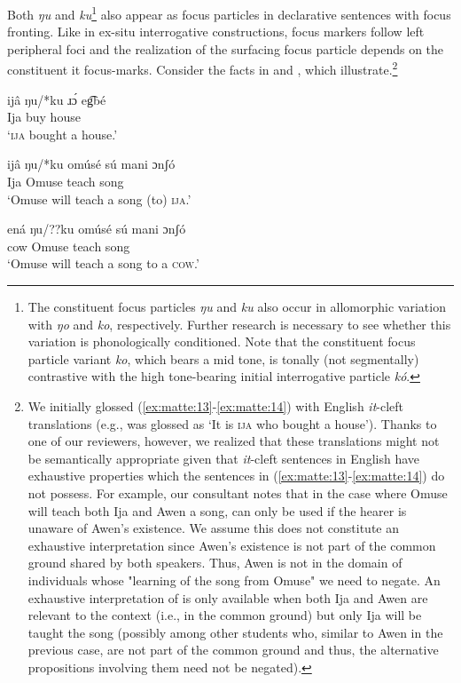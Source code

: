 \documentclass[output=paper,colorlinks,citecolor=brown
]{langscibook}
\begin{document}
Both \textit{ŋu} and \textit{ku}\footnote{The constituent focus particles \textit{ŋu} and \textit{ku} also occur in allomorphic variation with \textit{ŋo} and \textit{ko}, respectively. Further research is necessary to see whether this variation is phonologically conditioned. Note that the constituent focus particle variant \textit{ko}, which bears a mid tone, is tonally (not segmentally) contrastive with the high tone-bearing initial interrogative particle \textit{kó}.} also appear as focus particles in declarative sentences with focus fronting. Like in ex-situ interrogative constructions, focus markers follow left peripheral foci and the realization of the surfacing focus particle depends on the constituent it focus-marks. Consider the facts in  and , which illustrate.\footnote{We initially glossed (\ref{ex:matte:13}-\ref{ex:matte:14}) with English \textit{it}-cleft translations (e.g.,  was glossed as ‘It is \textsc{ija} who bought a house’). Thanks to one of our reviewers, however, we realized that these translations might not be semantically appropriate given that \textit{it}-cleft sentences in English have exhaustive properties which the sentences in (\ref{ex:matte:13}-\ref{ex:matte:14}) do not possess. For example, our consultant notes that in the case where Omuse will teach both Ija and Awen a song,  can only be used if the hearer is unaware of Awen's existence. We assume this does not constitute an exhaustive interpretation since Awen's existence is not part of the common ground shared by both speakers. Thus, Awen is not in the domain of individuals whose "learning of the song from Omuse" we need to negate. An exhaustive interpretation of  is only available when both Ija and Awen are relevant to the context (i.e., in the common ground) but only Ija will be taught the song (possibly among other students who, similar to Awen in the previous case, are not part of the common ground and thus, the alternative propositions involving them need not be negated).}

\ea \label{ex:matte:13}
\begin{xlist}

\ex \label{ex:matte:13a}
\gll ijâ ŋu/*ku ɹɔ́ eg͡bé\\
Ija \Foc{} buy house\\
\glt `\textsc{ija} bought a house.'

\ex \label{ex:matte:13b}
\gll ijâ ŋu/*ku	omúsé sú mani {\longrule} ɔnʃó\\
Ija \Foc{} Omuse \Fut{} teach {} song\\
\glt `Omuse will teach a song (to) \textsc{ija}.'

\ex \label{ex:matte:13c}
\gll ená ŋu/??ku omúsé sú mani {\longrule} ɔnʃó\\
cow	\Foc{} Omuse \Fut{} teach	{} song\\
\glt `Omuse will teach a song to a \textsc{cow}.'

\end{xlist}
\z
\end{document}
